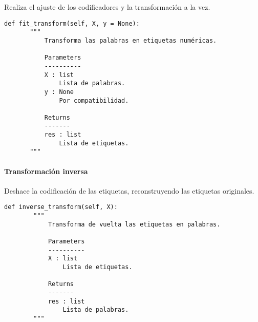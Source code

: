 Realiza el ajuste de los codificadores y la transformación a la vez.

\begin{lstlisting}
def fit_transform(self, X, y = None):
       """
           Transforma las palabras en etiquetas numéricas.

           Parameters
           ----------
           X : list
               Lista de palabras.
           y : None
               Por compatibilidad.

           Returns
           -------
           res : list
               Lista de etiquetas.
       """
\end{lstlisting}

\paragraph{Transformación inversa}

Deshace la codificación de las etiquetas, reconstruyendo las etiquetas originales.

\begin{lstlisting}
def inverse_transform(self, X):
        """
            Transforma de vuelta las etiquetas en palabras.

            Parameters
            ----------
            X : list
                Lista de etiquetas.

            Returns
            -------
            res : list
                Lista de palabras.
        """
\end{lstlisting}
\endinput
